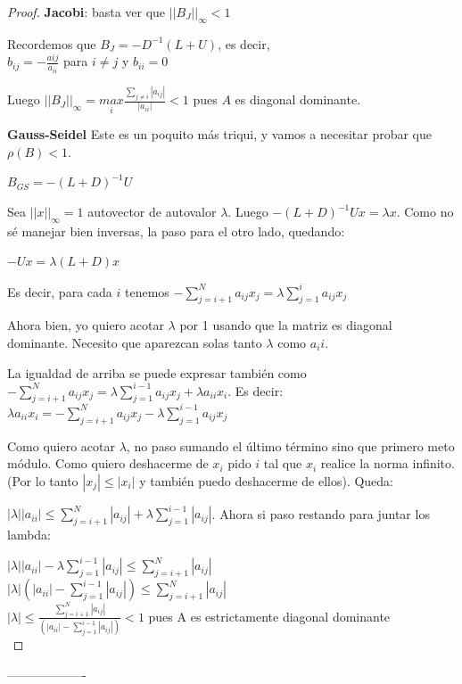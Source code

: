 \documentclass[10pt,a4paper,final]{report}
\begin{document}
\begin{proof}
\textbf{Jacobi}: basta ver que $||B_J||_{\infty}<1$

Recordemos que $B_J = -D^{-1}(L+U)$, es decir,\\

$b_{ij}=-\frac{a{ij}}{a_{ii}}$ para $i\neq j$ y $b_{ii}=0$

Luego $||B_J||_{\infty} = \underset{i}{max} \frac{\sum_{j\neq i} |a_{ij}|}{|a_{ii}|}<1$ pues $A$ es diagonal dominante. \bigskip

\textbf{Gauss-Seidel} Este es un poquito más triqui, y vamos a necesitar probar que $\rho(B)<1$.

$B_{GS} = - (L+D)^{-1} U$

Sea $||x||_\infty=1$ autovector de autovalor $\lambda$. Luego $- (L+D)^{-1} Ux = \lambda x$. Como no sé manejar bien inversas, la paso para el otro lado, quedando:

$-Ux = \lambda (L+D) x$

Es decir, para cada $i$ tenemos $- \sum_{j=i+1}^N a_{ij} x_j = \lambda \sum_{j=1}^i a_{ij} x_j$

Ahora bien, yo quiero acotar $\lambda$ por 1 usando que la matriz es diagonal dominante. Necesito que aparezcan solas tanto $\lambda$ como $a_ii$.

La igualdad de arriba se puede expresar también como $- \sum_{j=i+1}^N a_{ij} x_j = \lambda \sum_{j=1}^{i-1} a_{ij} x_j + \lambda a_{ii} x_i$. Es decir:\\

$\lambda a_{ii} x_i = - \sum_{j=i+1}^N a_{ij} x_j -  \lambda \sum_{j=1}^{i-1} a_{ij} x_j$

Como quiero acotar $\lambda$, no paso sumando el último término sino que primero meto módulo. Como quiero deshacerme de $x_i$ pido $i$ tal que $x_i$ realice la norma infinito. (Por lo tanto $|x_j|\leq |x_i|$ y también puedo deshacerme de ellos). Queda:

$|\lambda| |a_{ii}| \leq \sum_{j=i+1}^N |a_{ij}| + \lambda \sum_{j=1}^{i-1} |a_{ij}|$. Ahora si paso restando para juntar los lambda:

$|\lambda| |a_{ii}| -  \lambda \sum_{j=1}^{i-1} |a_{ij}|\leq \sum_{j=i+1}^N |a_{ij}|$\\

$|\lambda| (|a_{ii}| - \sum_{j=1}^{i-1} |a_{ij}|)\leq \sum_{j=i+1}^N |a_{ij}|$\\

$|\lambda| \leq \frac{\sum_{j=i+1}^N |a_{ij}|}{(|a_{ii}| - \sum_{j=1}^{i-1} |a_{ij}|)}<1$ pues A es estrictamente diagonal dominante\\

\end{proof}
-------------------
\end{document}
